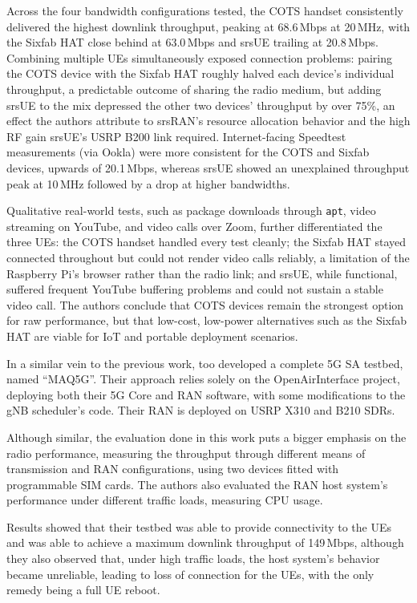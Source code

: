 Across the four bandwidth configurations tested, the \gls{COTS} handset consistently delivered the highest downlink throughput, peaking at 68.6\,Mbps at 20\,MHz, with the Sixfab HAT close behind at 63.0\,Mbps and srsUE trailing at 20.8\,Mbps. Combining multiple \glspl{UE} simultaneously exposed connection problems: pairing the \gls{COTS} device with the Sixfab HAT roughly halved each device's individual throughput, a predictable outcome of sharing the radio medium, but adding srsUE to the mix depressed the other two devices' throughput by over 75\%, an effect the authors attribute to srsRAN's resource allocation behavior and the high \gls{RF} gain srsUE's USRP B200 link required. Internet-facing Speedtest measurements (via Ookla) were more consistent for the \gls{COTS} and Sixfab devices, upwards of 20.1\,Mbps, whereas srsUE showed an unexplained throughput peak at 10\,MHz followed by a drop at higher bandwidths.

Qualitative real-world tests, such as package downloads through \texttt{apt}, video streaming on YouTube, and video calls over Zoom, further differentiated the three \glspl{UE}: the \gls{COTS} handset handled every test cleanly; the Sixfab HAT stayed connected throughout but could not render video calls reliably, a limitation of the Raspberry Pi's browser rather than the radio link; and srsUE, while functional, suffered frequent YouTube buffering problems and could not sustain a stable video call. The authors conclude that \gls{COTS} devices remain the strongest option for raw performance, but that low-cost, low-power alternatives such as the Sixfab HAT are viable for \gls{IoT} and portable deployment scenarios.

In a similar vein to the previous work, \textcite{vazquez2024maq5g} too developed a complete 5G \gls{SA} testbed, named ``MAQ5G''. Their approach relies solely on the OpenAirInterface project, deploying both their 5G Core and \gls{RAN} software, with some modifications to the \gls{gNB} scheduler's code. Their \gls{RAN} is deployed on USRP X310 and B210 \glspl{SDR}.

Although similar, the evaluation done in this work puts a bigger emphasis on the radio performance, measuring the throughput through different means of transmission and \gls{RAN} configurations, using two  devices fitted with programmable SIM cards. The authors also evaluated the \gls{RAN} host system's performance under different traffic loads, measuring CPU usage.

Results showed that their testbed was able to provide connectivity to the \glspl{UE} and was able to achieve a maximum downlink throughput of 149\,Mbps, although they also observed that, under high traffic loads, the host system's behavior became unreliable, leading to loss of connection for the \glspl{UE}, with the only remedy being a full \gls{UE} reboot.

